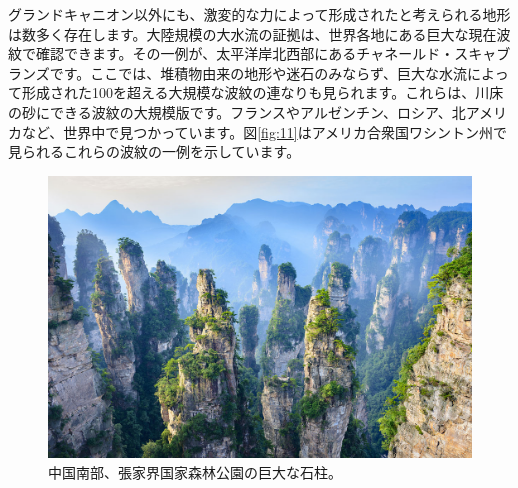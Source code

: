 \documentclass[10pt,twocolumn,letterpaper]{article}
\begin{document}
グランドキャニオン以外にも、激変的な力によって形成されたと考えられる地形は数多く存在します。大陸規模の大水流の証拠は、世界各地にある巨大な現在波紋で確認できます。その一例が、太平洋岸北西部にあるチャネールド・スキャブランズです。ここでは、堆積物由来の地形や迷石のみならず、巨大な水流によって形成された100を超える大規模な波紋の連なりも見られます\cite{78,79}。これらは、川床の砂にできる波紋の大規模版です。フランスやアルゼンチン、ロシア、北アメリカなど、世界中で見つかっています\cite{81}。図\ref{fig:11}はアメリカ合衆国ワシントン州で見られるこれらの波紋の一例を示しています\cite{80}。
\begin{figure}[t]
\begin{center}
   \includegraphics[width=1\linewidth]{zhangjiajie.jpg}
\end{center}
   \caption{中国南部、張家界国家森林公園の巨大な石柱。}
\label{fig:12}
\label{fig:onecol}
\end{figure}
\end{document}
